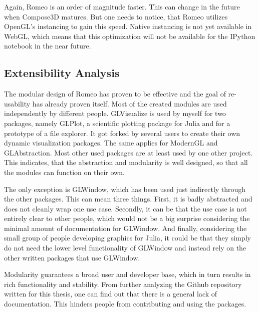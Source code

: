 Again, Romeo is an order of magnitude faster. This can change in the future when Compose3D matures.
But one needs to notice, that Romeo utilizes OpenGL's instancing to gain this speed. Native instancing is not yet available in WebGL, which means that this optimization will not be available for the IPython notebook in the near future.

\subsection{Extensibility Analysis}

The modular design of Romeo has proven to be effective and the goal of re-usability has already proven itself.
Most of the created modules are used independently by different people.
GLVisualize is used by myself for two packages, namely GLPlot, a scientific plotting package for Julia and for a prototype of a file explorer.
It got forked by several users to create their own dynamic visualization packages.
The same applies for ModernGL and GLAbstraction. Most other used packages are at least used by one other project.
This indicates, that the abstraction and modularity is well designed, so that all the modules can function on their own.

The only exception is GLWindow, which has been used just indirectly through the other packages. 
This can mean three things.
First, it is badly abstracted and does not cleanly wrap one use case.
Secondly, it can be that the use case is not entirely clear to other people, which would not be a big surprise considering the minimal amount of documentation for GLWindow.
And finally, considering the small group of people developing graphics for Julia, it could be that they simply do not need the lower level functionality of GLWindow and instead rely on the other written packages that use GLWindow.

Modularity guarantees a broad user and developer base, which in turn results in rich functionality and stability.
From further analyzing the Github repository written for this thesis, one can find out that there is a general lack of documentation.
This hinders people from contributing and using the packages.

